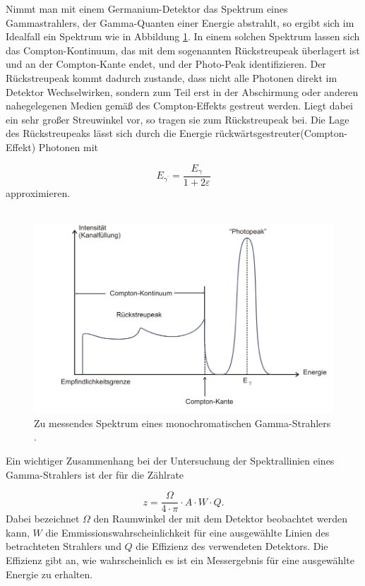 Nimmt man mit einem Germanium-Detektor das Spektrum eines Gammastrahlers, der Gamma-Quanten einer Energie abstrahlt,
so ergibt sich im Idealfall ein Spektrum wie in Abbildung \ref{fig:idealspektrum}. In einem solchen Spektrum lassen
sich das Compton-Kontinuum, das mit dem sogenannten Rückstreupeak überlagert ist und an der Compton-Kante endet, und der Photo-Peak identifizieren.
Der Rückstreupeak kommt dadurch zustande, dass nicht alle Photonen direkt im Detektor Wechselwirken, sondern zum Teil
erst in der Abschirmung oder anderen nahegelegenen Medien  gemäß des Compton-Effekts gestreut werden. Liegt dabei
ein sehr großer Streuwinkel vor, so tragen sie zum Rückstreupeak bei. Die Lage des Rückstreupeaks lässt sich durch
die Energie rückwärtsgestreuter(Compton-Effekt) Photonen mit

\begin{equation}
  \label{eqn:rstreupos}
  E_{\gamma^\text{'}} = \frac{E_{\gamma}}{1 + 2\varepsilon}
\end{equation}
approximieren.\\ \\

\FloatBarrier
\begin{figure}
  \includegraphics[width=\textwidth]{content/skizzen/idspektrum.png}
  \caption{Zu messendes Spektrum eines monochromatischen Gamma-Strahlers \cite{sample}.}
  \label{fig:idealspektrum}
\end{figure}
\FloatBarrier
Ein wichtiger Zusammenhang bei der Untersuchung der Spektrallinien eines Gamma-Strahlers ist der für
die Zählrate

\begin{equation}
  \label{eqn:effizienz}
  z = \frac{\Omega}{4\cdot \pi} \cdot A \cdot W \cdot Q .
\end{equation}
Dabei bezeichnet $\Omega$ den Raumwinkel der mit dem Detektor beobachtet werden kann, $W$ die
Emmissionswahrscheinlichkeit für eine ausgewählte Linien des betrachteten Strahlers und $Q$ die
Effizienz des verwendeten Detektors. Die Effizienz gibt an, wie wahrscheinlich es ist ein Messergebnis für eine ausgewählte
Energie zu erhalten.

\cite{sample}
